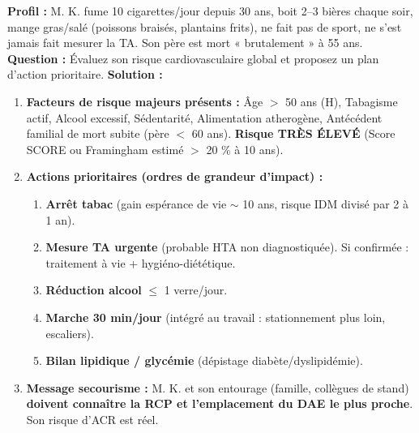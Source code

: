 \documentclass[11pt]{article}
\begin{document}
\begin{exoresolu}
\textbf{Profil :} M. K. fume 10 cigarettes/jour depuis 30 ans, boit 2--3 bières chaque soir, mange gras/salé (poissons braisés, plantains frits), ne fait pas de sport, ne s'est jamais fait mesurer la TA. Son père est mort « brutalement » à 55 ans.
\textbf{Question :} Évaluez son risque cardiovasculaire global et proposez un plan d'action prioritaire.
\textbf{Solution :}
\begin{enumerate}
    \item \textbf{Facteurs de risque majeurs présents :} Âge $>$ 50 ans (H), Tabagisme actif, Alcool excessif, Sédentarité, Alimentation atherogène, Antécédent familial de mort subite (père $<$ 60 ans). \textbf{Risque TRÈS ÉLEVÉ} (Score SCORE ou Framingham estimé $>$ 20 \% à 10 ans).
    \item \textbf{Actions prioritaires (ordres de grandeur d'impact) :}
    \begin{enumerate}
        \item \textbf{Arrêt tabac} (gain espérance de vie $\sim$ 10 ans, risque IDM divisé par 2 à 1 an).
        \item \textbf{Mesure TA urgente} (probable HTA non diagnostiquée). Si confirmée : traitement à vie + hygiéno-diététique.
        \item \textbf{Réduction alcool} $\le$ 1 verre/jour.
        \item \textbf{Marche 30 min/jour} (intégré au travail : stationnement plus loin, escaliers).
        \item \textbf{Bilan lipidique / glycémie} (dépistage diabète/dyslipidémie).
    \end{enumerate}
    \item \textbf{Message secourisme :} M. K. et son entourage (famille, collègues de stand) \textbf{doivent connaître la RCP et l'emplacement du DAE le plus proche}. Son risque d'ACR est réel.
\end{enumerate}
\end{exoresolu}
\end{document}
